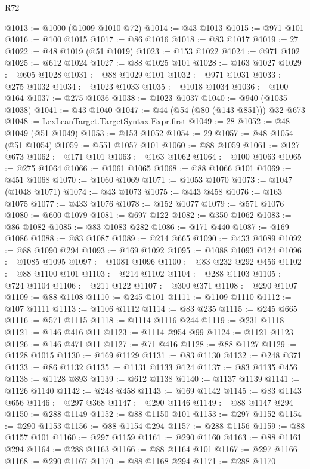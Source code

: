 \begin{lexlean}{R72}
\begin{coremodule}
@1013 := @1000 (@1009 @1010 @72)
@1014 := @43 @1013
@1015 := @971 @101
@1016 := @100 @1015
@1017 := @86 @1016
@1018 := @83 @1017
@1019 := 27
@1022 := @48 @1019 (@51 @1019)
@1023 := @153 @1022
@1024 := @971 @102
@1025 := @612 @1024
@1027 := @88 @1025 @101
@1028 := @163 @1027
@1029 := @605 @1028
@1031 := @88 @1029 @101
@1032 := @971 @1031
@1033 := @275 @1032
@1034 := @1023 @1033
@1035 := @1018 @1034
@1036 := @100 @164
@1037 := @275 @1036
@1038 := @1023 @1037
@1040 := @940 (@1035 @1038)
@1041 := @43 @1040
@1047 := @44 (@54 (@80 (@143 @851))) @32 @673
@1048 := LexLeanTarget.TargetSyntax.Expr.first
@1049 := 28
@1052 := @48 @1049 (@51 @1049)
@1053 := @153 @1052
@1054 := 29
@1057 := @48 @1054 (@51 @1054)
@1059 := @551 @1057 @101
@1060 := @88 @1059
@1061 := @127 @673
@1062 := @171 @101
@1063 := @163 @1062
@1064 := @100 @1063
@1065 := @275 @1064
@1066 := @1061 @1065
@1068 := @88 @1066 @101
@1069 := @451 @1068
@1070 := @1060 @1069
@1071 := @1053 @1070
@1073 := @1047 (@1048 @1071)
@1074 := @43 @1073
@1075 := @443 @458
@1076 := @163 @1075
@1077 := @433 @1076
@1078 := @152 @1077
@1079 := @571 @1076
@1080 := @600 @1079
@1081 := @697 @122
@1082 := @350 @1062
@1083 := @86 @1082
@1085 := @83 @1083 @282
@1086 := @171 @440
@1087 := @169 @1086
@1088 := @83 @1087
@1089 := @214 @665
@1090 := @433 @1089
@1092 := @88 @1090 @294
@1093 := @169 @1092
@1095 := @1088 @1093 @124
@1096 := @1085 @1095
@1097 := @1081 @1096
@1100 := @83 @232 @292 @456
@1102 := @88 @1100 @101
@1103 := @214 @1102
@1104 := @288 @1103
@1105 := @724 @1104
@1106 := @211 @122
@1107 := @300 @371
@1108 := @290 @1107
@1109 := @88 @1108
@1110 := @245 @101
@1111 := @1109 @1110
@1112 := @107 @1111
@1113 := @1106 @1112
@1114 := @83 @235
@1115 := @245 @665
@1116 := @571 @1115
@1118 := @1114 @1116 @244
@1119 := @231 @1118
@1121 := @146 @416 @11
@1123 := @1114 @954 @99
@1124 := @1121 @1123
@1126 := @146 @471 @11
@1127 := @71 @416
@1128 := @88 @1127
@1129 := @1128 @1015
@1130 := @169 @1129
@1131 := @83 @1130
@1132 := @248 @371
@1133 := @86 @1132
@1135 := @1131 @1133 @124
@1137 := @83 @1135 @456
@1138 := @1128 @893
@1139 := @612 @1138
@1140 := @1137 @1139
@1141 := @1126 @1140
@1142 := @248 @458
@1143 := @169 @1142
@1145 := @83 @1143 @656
@1146 := @297 @368
@1147 := @290 @1146
@1149 := @88 @1147 @294
@1150 := @288 @1149
@1152 := @88 @1150 @101
@1153 := @297 @1152
@1154 := @290 @1153
@1156 := @88 @1154 @294
@1157 := @288 @1156
@1159 := @88 @1157 @101
@1160 := @297 @1159
@1161 := @290 @1160
@1163 := @88 @1161 @294
@1164 := @288 @1163
@1166 := @88 @1164 @101
@1167 := @297 @1166
@1168 := @290 @1167
@1170 := @88 @1168 @294
@1171 := @288 @1170

\end{coremodule}
\end{lexlean}

